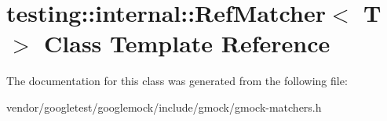 \hypertarget{classtesting_1_1internal_1_1RefMatcher}{}\section{testing\+:\+:internal\+:\+:Ref\+Matcher$<$ T $>$ Class Template Reference}
\label{classtesting_1_1internal_1_1RefMatcher}


The documentation for this class was generated from the following file\+:\begin{DoxyCompactItemize}
\item 
vendor/googletest/googlemock/include/gmock/gmock-\/matchers.\+h\end{DoxyCompactItemize}
